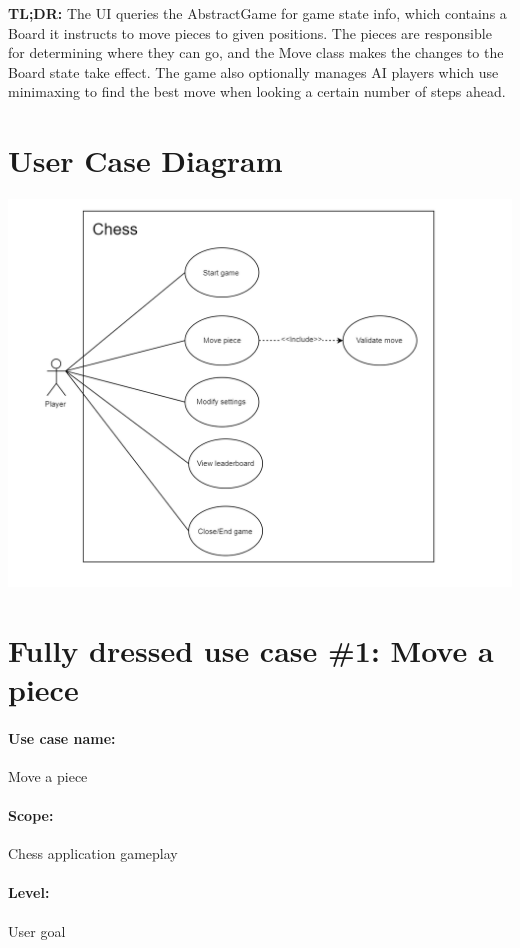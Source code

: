 \documentclass{article}
\begin{document}
\noindent
\textbf{TL;DR:} The UI queries the AbstractGame for game state info, which contains a Board it instructs to move pieces to given positions. The pieces are responsible for determining where they can go, and the Move class makes the changes to the Board state take effect. The game also optionally manages AI players which use minimaxing to find the best move when looking a certain number of steps ahead.

\section*{User Case Diagram}
\includegraphics[width=15cm]{usecasediagram}

\section*{Fully dressed use case \#1: Move a piece}

\paragraph{Use case name:} Move a piece

\paragraph{Scope:} Chess application gameplay

\paragraph{Level:} User goal
\end{document}
